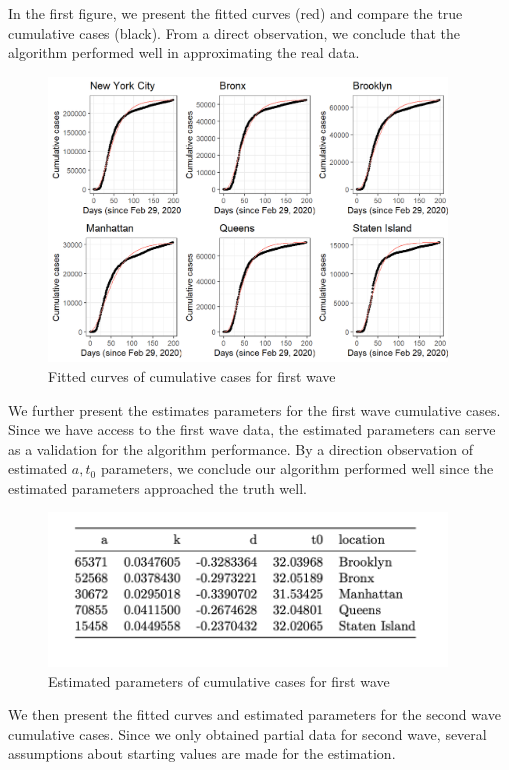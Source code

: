 \documentclass[
]{article}
\begin{document}
In the first figure, we present the fitted curves (red) and compare the
true cumulative cases (black). From a direct observation, we conclude
that the algorithm performed well in approximating the real data.

\begin{figure}
\centering
\includegraphics[width=4.16667in,height=\textheight]{plots/case_plots/no_start_curve/wave1_all.png}
\caption{Fitted curves of cumulative cases for first wave}
\end{figure}

We further present the estimates parameters for the first wave
cumulative cases. Since we have access to the first wave data, the
estimated parameters can serve as a validation for the algorithm
performance. By a direction observation of estimated \(a,t_0\)
parameters, we conclude our algorithm performed well since the estimated
parameters approached the truth well.

\begin{figure}
\centering
\includegraphics[width=4.16667in,height=\textheight]{plots/case_plots/no_start_curve/wave_1_para.png}
\caption{Estimated parameters of cumulative cases for first wave}
\end{figure}

We then present the fitted curves and estimated parameters for the
second wave cumulative cases. Since we only obtained partial data for
second wave, several assumptions about starting values are made for the
estimation.
\end{document}
